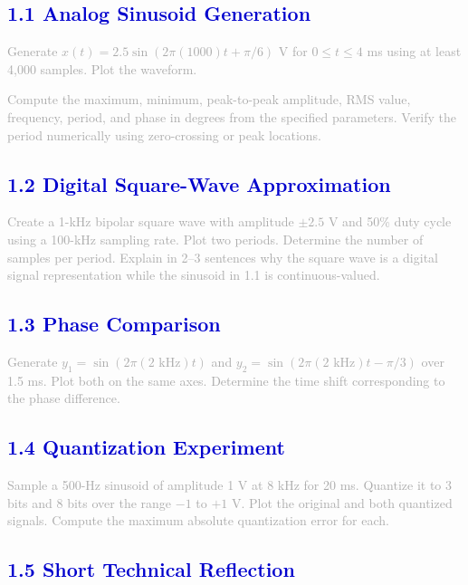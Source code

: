 \documentclass[12pt,a4paper]{article}
\begin{document}
\subsection*{\large\textbf{\textcolor{mediumblue}{1.1 Analog Sinusoid Generation}}}

\textcolor{darkgray}{
Generate $x(t) = 2.5 \sin(2\pi(1000)t + \pi/6)$ V for $0 \le t \le 4$ ms using at least 4,000 samples. Plot the waveform.

Compute the maximum, minimum, peak-to-peak amplitude, RMS value, frequency, period, and phase in degrees from the specified parameters. Verify the period numerically using zero-crossing or peak locations.
}

\subsection*{\large\textbf{\textcolor{mediumblue}{1.2 Digital Square-Wave Approximation}}}

\textcolor{darkgray}{
Create a 1-kHz bipolar square wave with amplitude $\pm 2.5$ V and 50\% duty cycle using a 100-kHz sampling rate. Plot two periods. Determine the number of samples per period. Explain in 2--3 sentences why the square wave is a digital signal representation while the sinusoid in 1.1 is continuous-valued.
}

\subsection*{\large\textbf{\textcolor{mediumblue}{1.3 Phase Comparison}}}

\textcolor{darkgray}{
Generate $y_1 = \sin(2\pi(2 \text{ kHz})t)$ and $y_2 = \sin(2\pi(2 \text{ kHz})t - \pi/3)$ over 1.5 ms. Plot both on the same axes. Determine the time shift corresponding to the phase difference.
}

\subsection*{\large\textbf{\textcolor{mediumblue}{1.4 Quantization Experiment}}}

\textcolor{darkgray}{
Sample a 500-Hz sinusoid of amplitude 1 V at 8 kHz for 20 ms. Quantize it to 3 bits and 8 bits over the range $-1$ to $+1$ V. Plot the original and both quantized signals. Compute the maximum absolute quantization error for each.
}

\subsection*{\large\textbf{\textcolor{mediumblue}{1.5 Short Technical Reflection}}}
\end{document}
